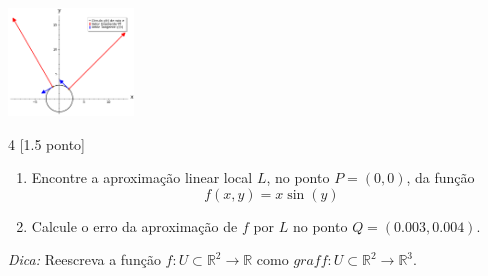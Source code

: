 \documentclass[../main.tex]{subfiles}
\begin{document}
\begin{solucao}
\begin{enumerate}
				\begin{center}
					\includegraphics[width=0.25\textwidth]{imagens/av1/picture_av1_q03_item02.png}
				\end{center}
				
			\end{enumerate}
		\end{solucao}
		
		\begin{exercicio}{4}
			[1.5 ponto]
			\begin{enumerate}[label=\alph*)]
				\item Encontre a aproximação linear local $L$, no ponto $P = (0,0)$, da função
				\[
				f(x,y)=x\sin(y)
				\]
				\item Calcule o erro da aproximação de $f$ por $L$ no ponto $Q=(0.003, 0.004)$.
			\end{enumerate}
			\textit{Dica:} Reescreva a função $f\colon U\subset \mathbb{R}^2 \to \mathbb{R}$ como $graff\colon U\subset\mathbb{R}^2 \to \mathbb{R}^3$.
		\end{exercicio}
\end{document}
